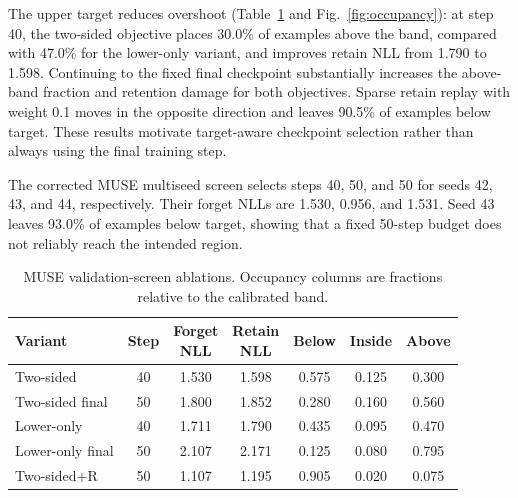 \documentclass[10pt,twocolumn]{article}
\begin{document}
The upper target reduces overshoot (Table~\ref{tab:ablations} and
Fig.~\ref{fig:occupancy}): at step 40, the two-sided objective places 30.0\% of
examples above the band, compared with 47.0\% for the lower-only variant, and
improves retain NLL from 1.790 to 1.598. Continuing to the fixed final checkpoint
substantially increases the above-band fraction and retention damage for both
objectives. Sparse retain replay with weight 0.1 moves in the opposite direction
and leaves 90.5\% of examples below target. These results motivate target-aware
checkpoint selection rather than always using the final training step.

The corrected MUSE multiseed screen selects steps 40, 50, and 50 for seeds 42,
43, and 44, respectively. Their forget NLLs are 1.530, 0.956, and 1.531. Seed
43 leaves 93.0\% of examples below target, showing that a fixed 50-step budget
does not reliably reach the intended region.

\begin{table}[H]
\centering
\caption{MUSE validation-screen ablations. Occupancy columns are fractions
relative to the calibrated band.}
\label{tab:ablations}
\scriptsize
\renewcommand{\arraystretch}{1.08}
\setlength{\tabcolsep}{1.8pt}
\begin{tabular}{@{}lcccccc@{}}
\toprule
Variant & Step & \makecell{Forget\\NLL} & \makecell{Retain\\NLL}
& Below & Inside & Above\\
\midrule
Two-sided       & 40 & 1.530 & 1.598 & 0.575 & 0.125 & 0.300\\
Two-sided final & 50 & 1.800 & 1.852 & 0.280 & 0.160 & 0.560\\
Lower-only      & 40 & 1.711 & 1.790 & 0.435 & 0.095 & 0.470\\
Lower-only final& 50 & 2.107 & 2.171 & 0.125 & 0.080 & 0.795\\
Two-sided+R     & 50 & 1.107 & 1.195 & 0.905 & 0.020 & 0.075\\
\bottomrule
\end{tabular}
\end{table}
\end{document}
